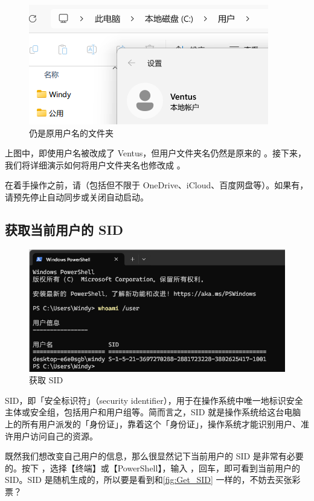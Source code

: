{{{\begin{figure}[htb!]
  \centering
  \includegraphics[width=.5\textwidth]{assets/advanced/Unchanged_User_Folder.png}
  \caption{仍是原用户名的文件夹}
  \label{fig:Unchanged_User_Folder}
\end{figure}

上图中，即使用户名被改成了 Ventus，但用户文件夹名仍然是原来的 。接下来，我们将详细演示如何将用户文件夹名也修改成 。

\begin{dangerbox}
  在着手操作之前，请（包括但不限于 OneDrive、iCloud、百度网盘等）。如果有，请预先停止自动同步或关闭自动启动。
\end{dangerbox}

\subsection{获取当前用户的 SID}

\begin{figure}[htb!]
  \centering
  \includegraphics[width=.6\textwidth]{assets/advanced/Get_SID.png}
  \caption{获取 SID}
  \label{fig:Get_SID}
\end{figure}

SID，即「安全标识符」（security identifier），用于在操作系统中唯一地标识安全主体或安全组，包括用户和用户组等。简而言之，SID 就是操作系统给这台电脑上的所有用户派发的「身份证」，靠着这个「身份证」，操作系统才能识别用户、准许用户访问自己的资源。

既然我们想改变自己用户的信息，那么很显然记下当前用户的 SID 是非常有必要的。按下 ，选择【终端】或【PowerShell】，输入 ，回车，即可看到当前用户的 SID。SID 是随机生成的，所以要是看到和\autoref{fig:Get_SID} 一样的，不妨去买张彩票？

}}}
